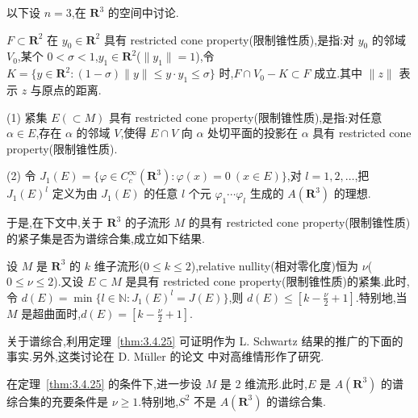 以下设 $n = 3$,在 $\mathbf{R}^{3}$ 的空间中讨论.

\begin{definition}\label{def:3.4.23}
$F \subset \mathbf{R}^{2}$ 在 $y_{0} \in \mathbf{R}^{2}$ 具有 restricted cone property(限制锥性质),是指:对 $y_{0}$ 的邻域 $V_{0}$,某个 $0 < \sigma < 1$,$y_{1} \in \mathbf{R}^{2}$($\|y_{1}\| = 1$),令 $K = \{y \in \mathbf{R}^{2}: (1 - \sigma)\|y\| \leq y \cdot y_{1} \leq \sigma\}$ 时,$F \cap V_{0} - K \subset F$ 成立.其中 $\|z\|$ 表示 $z$ 与原点的距离.
\end{definition}

\begin{definition}\label{def:3.4.24}
(1) 紧集 $E(\subset M)$ 具有 restricted cone property(限制锥性质),是指:对任意 $\alpha \in E$,存在 $\alpha$ 的邻域 $V$,使得 $E \cap V$ 向 $\alpha$ 处切平面的投影在 $\alpha$ 具有 restricted cone property(限制锥性质).

(2) 令 $J_{1}(E) = \{\varphi \in C_{c}^{\infty}(\mathbf{R}^{3}): \varphi(x) = 0 \ (x \in E)\}$,对 $l = 1, 2, \ldots$,把 $J_{1}(E)^{l}$ 定义为由 $J_{1}(E)$ 的任意 $l$ 个元 $\varphi_{1}\cdots\varphi_{l}$ 生成的 $A(\mathbf{R}^{3})$ 的理想.
\end{definition}

于是,在下文中,关于 $\mathbf{R}^{3}$ 的子流形 $M$ 的具有 restricted cone property(限制锥性质)的紧子集是否为谱综合集,成立如下结果.

\begin{theorem}\label{thm:3.4.25}
设 $M$ 是 $\mathbf{R}^{3}$ 的 $k$ 维子流形($0 \leq k \leq 2$),relative nullity(相对零化度)恒为 $\nu$($0 \leq \nu \leq 2$).又设 $E \subset M$ 是具有 restricted cone property(限制锥性质)的紧集.此时,令 $d(E) = \min\{l \in \mathbb{N}: J_{1}(E)^{l} = J(E)\}$,则 $d(E) \leq \left[k - \frac{\nu}{2} + 1\right]$.特别地,当 $M$ 是超曲面时,$d(E) = \left[k - \frac{\nu}{2} + 1\right]$.
\end{theorem}

关于谱综合,利用定理~\ref{thm:3.4.25} 可证明作为 L. Schwartz 结果的推广的下面的事实.另外,这类讨论在 D. Müller 的论文 \cite{ch3:35} 中对高维情形作了研究.

\begin{theorem}\label{thm:3.4.26}
在定理~\ref{thm:3.4.25} 的条件下,进一步设 $M$ 是 2 维流形.此时,$E$ 是 $A(\mathbf{R}^{3})$ 的谱综合集的充要条件是 $\nu \geq 1$.特别地,$S^{2}$ 不是 $A(\mathbf{R}^{3})$ 的谱综合集.
\end{theorem}
